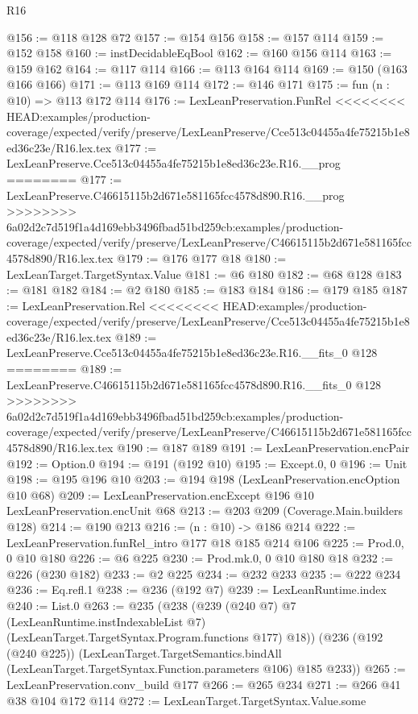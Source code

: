 \begin{lexlean}{R16}
\begin{coremodule}
{{{{{@156 := @118 @128 @72
@157 := @154 @156
@158 := @157 @114
@159 := @152 @158
@160 := instDecidableEqBool
@162 := @160 @156 @114
@163 := @159 @162
@164 := @117 @114
@166 := @113 @164 @114
@169 := @150 (@163 @166 @166)
@171 := @113 @169 @114
@172 := @146 @171
@175 := fun (n : @10) => @113 @172 @114
@176 := LexLeanPreservation.FunRel
<<<<<<<< HEAD:examples/production-coverage/expected/verify/preserve/LexLeanPreserve/Cce513c04455a4fe75215b1e8ed36c23e/R16.lex.tex
@177 := LexLeanPreserve.Cce513c04455a4fe75215b1e8ed36c23e.R16.__prog
========
@177 := LexLeanPreserve.C46615115b2d671e581165fcc4578d890.R16.__prog
>>>>>>>> 6a02d2c7d519f1a4d169ebb3496fbad51bd259cb:examples/production-coverage/expected/verify/preserve/LexLeanPreserve/C46615115b2d671e581165fcc4578d890/R16.lex.tex
@179 := @176 @177 @18
@180 := LexLeanTarget.TargetSyntax.Value
@181 := @6 @180
@182 := @68 @128
@183 := @181 @182
@184 := @2 @180
@185 := @183 @184
@186 := @179 @185
@187 := LexLeanPreservation.Rel
<<<<<<<< HEAD:examples/production-coverage/expected/verify/preserve/LexLeanPreserve/Cce513c04455a4fe75215b1e8ed36c23e/R16.lex.tex
@189 := LexLeanPreserve.Cce513c04455a4fe75215b1e8ed36c23e.R16.__fits_0 @128
========
@189 := LexLeanPreserve.C46615115b2d671e581165fcc4578d890.R16.__fits_0 @128
>>>>>>>> 6a02d2c7d519f1a4d169ebb3496fbad51bd259cb:examples/production-coverage/expected/verify/preserve/LexLeanPreserve/C46615115b2d671e581165fcc4578d890/R16.lex.tex
@190 := @187 @189
@191 := LexLeanPreservation.encPair
@192 := Option.{0}
@194 := @191 (@192 @10)
@195 := Except.{0, 0}
@196 := Unit
@198 := @195 @196 @10
@203 := @194 @198 (LexLeanPreservation.encOption @10 @68)
@209 := LexLeanPreservation.encExcept @196 @10 LexLeanPreservation.encUnit @68
@213 := @203 @209 (Coverage.Main.builders @128)
@214 := @190 @213
@216 := (n : @10) -> @186 @214
@222 := LexLeanPreservation.funRel_intro @177 @18 @185 @214 @106
@225 := Prod.{0, 0} @10 @180
@226 := @6 @225
@230 := Prod.mk.{0, 0} @10 @180 @18
@232 := @226 (@230 @182)
@233 := @2 @225
@234 := @232 @233
@235 := @222 @234
@236 := Eq.refl.{1}
@238 := @236 (@192 @7)
@239 := LexLeanRuntime.index
@240 := List.{0}
@263 := @235
    (@238
      (@239
        (@240 @7)
        @7
        (LexLeanRuntime.instIndexableList @7)
        (LexLeanTarget.TargetSyntax.Program.functions @177)
        @18))
    (@236
      (@192 (@240 @225))
      (LexLeanTarget.TargetSemantics.bindAll
        (LexLeanTarget.TargetSyntax.Function.parameters @106)
        @185
        @233))
@265 := LexLeanPreservation.conv_build @177
@266 := @265 @234
@271 := @266 @41 @38 @104 @172 @114
@272 := LexLeanTarget.TargetSyntax.Value.some
}}}}}
\end{coremodule}
\end{lexlean}
